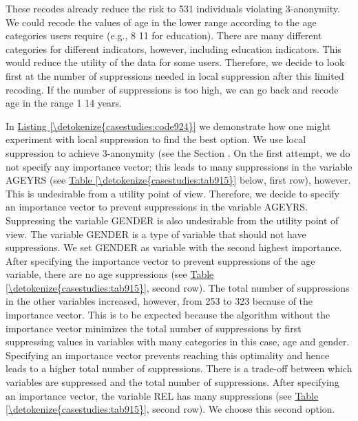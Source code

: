 \documentclass[letterpaper,10pt,english]{sphinxmanual}
\begin{document}
These recodes already reduce the risk to 531 individuals violating
3-anonymity. We could recode the values of age in the lower range
according to the age categories users require (e.g., 8 \textendash{} 11 for
education). There are many different categories for different
indicators, however, including education indicators. This would reduce
the utility of the data for some users. Therefore, we decide to look
first at the number of suppressions needed in local suppression after
this limited recoding. If the number of suppressions is too high, we can
go back and recode age in the range 1 \textendash{} 14 years.

In \hyperref[\detokenize{casestudies:code924}]{Listing \ref{\detokenize{casestudies:code924}}} we demonstrate how one might experiment with local
suppression to find the best option. We use local suppression to achieve
3-anonymity (see the Section  . On the first
attempt, we do not specify any importance vector; this leads to many
suppressions in the variable AGEYRS (see \hyperref[\detokenize{casestudies:tab915}]{Table \ref{\detokenize{casestudies:tab915}}} below, first row),
however. This is undesirable from a utility point of view. Therefore, we
decide to specify an importance vector to prevent suppressions in the
variable AGEYRS. Suppressing the variable GENDER is also undesirable
from the utility point of view. The variable GENDER is a type of
variable that should not have suppressions. We set GENDER as variable
with the second highest importance. After specifying the importance
vector to prevent suppressions of the age variable, there are no age
suppressions (see \hyperref[\detokenize{casestudies:tab915}]{Table \ref{\detokenize{casestudies:tab915}}}, second row). The total number of
suppressions in the other variables increased, however, from 253 to 323
because of the importance vector. This is to be expected because the
algorithm without the importance vector minimizes the total number of
suppressions by first suppressing values in variables with many
categories \textendash{} in this case, age and gender. Specifying an importance
vector prevents reaching this optimality and hence leads to a higher
total number of suppressions. There is a trade-off between which
variables are suppressed and the total number of suppressions. After
specifying an importance vector, the variable REL has many suppressions
(see \hyperref[\detokenize{casestudies:tab915}]{Table \ref{\detokenize{casestudies:tab915}}}, second row). We choose this second option.
\end{document}
